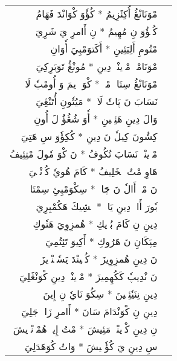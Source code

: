 \documentclass[a4paper, 12pt]{report}
\begin{document}
\begin{longtable}{rl}
\textarabic{مْوَنَانْڠُ أُكِئَزِيمُ  *  كُؤٗوَ كْوَانْدَ فَهَامُ} & \\ 
\textarabic{كُتٖؤُوَ نِ مُهِيمُ  *  نِ أَامرِ يَ شَرِيَ} & \\ 
[8mm] 

\textarabic{مْتُومِ أَلِبَئِينِ  *  أَكَتوَمْبِيَ أٗوَانِ} & \\ 
\textarabic{مْوَنَامْكٖ مْوٖينْيٖ دِينِ  *  مُونْڠُ تَوَبَرِكِيَ} & \\ 
[8mm] 

\textarabic{مْوَنَانْڠُ سِتَاكٖ مْكٖ  *  كْوَ وٖيمَ وَ أُومْبٗ لَاكٖ} & \\ 
\textarabic{نَسَابَ نَ پَاتٗ لَاكٖ  *  مَيُتٗونِ أُتَنْڠِيَ} & \\ 
[8mm] 

\textarabic{وَالَ دِينِ هَئِنٖينِ  *  أٗوَ شُڠُؤُ لَ أُونِ} & \\ 
\textarabic{كِشُونَ كِيلٗ نَ دِينِ  *  كُكِؤٗوَ سِ هَتِيَ} & \\ 
[8mm] 

\textarabic{مْوٖينْيٖ نَسَابَ تُكُوفُ  *  نَ كْوَ مٗولَ مْتِئِيفُ} & \\ 
\textarabic{هَاوِ مْتُ مٖخَلِيفُ  *  كَامَ هُويٗ كُزٖنْڠٖيَ} & \\ 
[8mm] 

\textarabic{نَ مْكٖ أَالٗ نَ چَاكٖ  *  سِكْوَمْبِئِ سِمْتَاكٖ} & \\ 
\textarabic{بٗورَ أَاوٖ دِينِ يَاكٖ  *  مٖشِيكَ هَكُمْبِرِيَ} & \\ 
[8mm] 

\textarabic{دِينِ نِ كَامَ بُرٖيكِ  *  هُمزِوِيَ هَتٗوكِ} & \\ 
\textarabic{مِپَكَانِ نَ هَرُوكِ  *  أَكِيوَ تَئِتُمِيَ} & \\ 
[8mm] 

\textarabic{نَ دِينِ هُمزِوِيزَ  *  كُتٖينْدَ يَسٗپٖنْدٖيزَ} & \\ 
\textarabic{نَ نْدِيپٗ كَكُهِمِيزَ  *  مْوٖينْيٖ دِينِ كْوَنْڠَلِيَ} & \\ 
[8mm] 

\textarabic{دِينِ نِنَيٗئِنٖينَ  *  سِكُوَ نَايٗ نِ إِينَ} & \\ 
\textarabic{دِينِ نِ كْوَنْدَامَ سَانَ  *  أَامرِ زَاكٖ جَلِيَ} & \\ 
[8mm] 

\textarabic{نِ دِينِ كْوٖينْيٖ مَئِيشَ  *  مْتُ إِيوٖ هُمْوٖنْدٖيشَ} & \\ 
\textarabic{سِ دِينِ يَ كُؤٗنٖيشَ  *  وَاتُ كُوَهَدَلِيَ} & \\ 
[8mm] 


\end{longtable}
\end{document}
